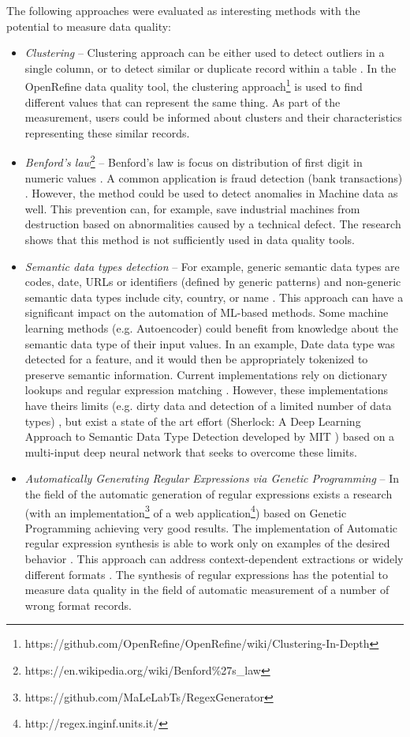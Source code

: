 			The following approaches were evaluated as interesting methods with the potential to measure data quality:
					
			\begin{itemize}
				\item \emph{Clustering} -- Clustering approach can be either used to detect outliers in a single column, or to detect similar or duplicate record within a table \cite{Ehrlinger2019}. In the OpenRefine data quality tool, the clustering approach\footnote{https://github.com/OpenRefine/OpenRefine/wiki/Clustering-In-Depth} is used to find different values that can represent the same thing. As part of the measurement, users could be informed about clusters and their characteristics representing these similar records.
				\item \emph{Benford's law}\footnote{https://en.wikipedia.org/wiki/Benford\%27s\_law} -- Benford's law is focus on distribution of first digit in numeric values \cite{Ehrlinger2019}. A common application is fraud detection (bank transactions) \cite{Ehrlinger2019}. However, the method could be used to detect anomalies in Machine data  as well. This prevention can, for example, save industrial machines from destruction based on abnormalities caused by a technical defect. The research \cite{Ehrlinger2019} shows that this method is not sufficiently used in data quality tools.
				\item \emph{Semantic data types detection} -- For example, generic semantic data types are codes, date, URLs or identifiers (defined by generic patterns) and non-generic semantic data types include city, country, or name \cite{Ehrlinger2019}. This approach can have a significant impact on the automation of ML-based methods. Some machine learning methods (e.g. Autoencoder) could benefit from knowledge about the semantic data type of their input values. In an example, Date data type was detected for a feature, and it would then be appropriately tokenized to preserve semantic information. Current implementations rely on dictionary lookups and regular expression matching \cite{Hulsebos2019}. However, these implementations have theirs limits (e.g. dirty data and detection of a limited number of data types) \cite{Hulsebos2019}, but exist a state of the art effort (\textsf{Sherlock}: A Deep Learning Approach to Semantic Data Type Detection developed by MIT \cite{Hulsebos2019}) based on a multi-input deep neural network that seeks to overcome these limits.
				\item \emph{Automatically Generating Regular Expressions via Genetic Programming} -- In the field of the automatic generation of regular expressions exists a research \cite{Bartoli2016} (with an implementation\footnote{https://github.com/MaLeLabTs/RegexGenerator} of a web application\footnote{http://regex.inginf.units.it/}) based on Genetic Programming achieving very good results. The implementation of Automatic regular expression synthesis is able to work only on examples of the desired behavior \cite{Bartoli2016}. This approach can address context-dependent extractions or widely different formats \cite{Bartoli2016}. The synthesis of regular expressions has the potential to measure data quality in the field of automatic measurement of a number of wrong format records.

\end{itemize}
